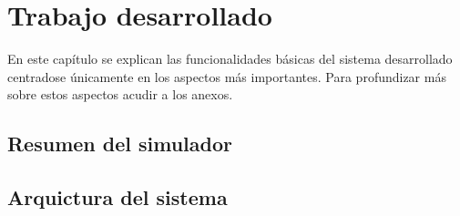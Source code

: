 \chapter{Trabajo desarrollado}
\thispagestyle{empty}

En este capítulo se explican las funcionalidades básicas del sistema desarrollado centradose únicamente en los aspectos más importantes. Para profundizar más sobre estos aspectos acudir a los anexos.

\section{Resumen del simulador}
\thispagestyle{empty}



\section{Arquictura del sistema}
\thispagestyle{empty}



